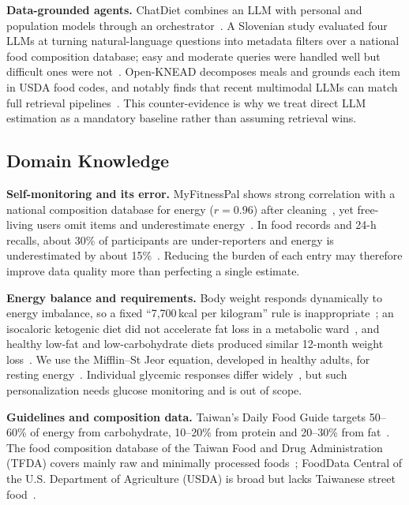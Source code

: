 \documentclass[conference]{IEEEtran}
\begin{document}
\textbf{Data-grounded agents.} ChatDiet combines an LLM with personal and population models through an orchestrator~\cite{yang2024}. A Slovenian study evaluated four LLMs at turning natural-language questions into metadata filters over a national food composition database; easy and moderate queries were handled well but difficult ones were not~\cite{pozarnik2026}. Open-KNEAD decomposes meals and grounds each item in USDA food codes, and notably finds that recent multimodal LLMs can match full retrieval pipelines~\cite{coburn2026}. This counter-evidence is why we treat direct LLM estimation as a mandatory baseline rather than assuming retrieval wins.

\subsection{Domain Knowledge}

\textbf{Self-monitoring and its error.} MyFitnessPal shows strong correlation with a national composition database for energy ($r=0.96$) after cleaning~\cite{evenepoel2020}, yet free-living users omit items and underestimate energy~\cite{chen2019}. In food records and 24-h recalls, about 30\% of participants are under-reporters and energy is underestimated by about 15\%~\cite{poslusna2009}. Reducing the burden of each entry may therefore improve data quality more than perfecting a single estimate.

\textbf{Energy balance and requirements.} Body weight responds dynamically to energy imbalance, so a fixed ``7{,}700\,kcal per kilogram'' rule is inappropriate~\cite{hall2011}; an isocaloric ketogenic diet did not accelerate fat loss in a metabolic ward~\cite{hall2016}, and healthy low-fat and low-carbohydrate diets produced similar 12-month weight loss~\cite{gardner2018}. We use the Mifflin--St Jeor equation, developed in healthy adults, for resting energy~\cite{mifflin1990}. Individual glycemic responses differ widely~\cite{zeevi2015}, but such personalization needs glucose monitoring and is out of scope.

\textbf{Guidelines and composition data.} Taiwan's Daily Food Guide targets 50--60\% of energy from carbohydrate, 10--20\% from protein and 20--30\% from fat~\cite{hpa_guide}. The food composition database of the Taiwan Food and Drug Administration (TFDA) covers mainly raw and minimally processed foods~\cite{tfda_db}; FoodData Central of the U.S. Department of Agriculture (USDA) is broad but lacks Taiwanese street food~\cite{usda_fdc}.
\end{document}
